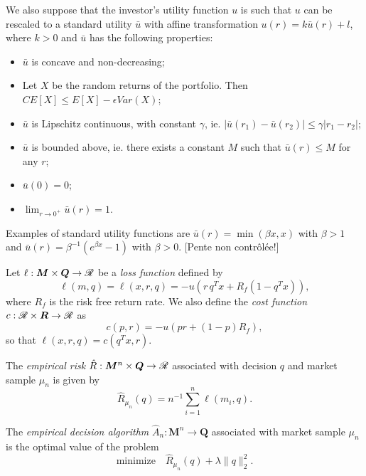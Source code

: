 \documentclass[11pt]{article}
\begin{document}
\begin{assumption}
  We also suppose that the investor's utility function $u$ is such that $u$ can be
  rescaled to a standard utility $\bar u$ with affine transformation
  $u(r) = k\bar u(r) + l$, where $k>0$ and $\bar u$ has the following properties:
  \begin{itemize}
  \item $\bar u$ is concave and non-decreasing;
  \item Let $X$ be the random returns of the portfolio. Then
    $CE[X] \leq E[X] - \epsilon Var(X)$;
  \item $\bar u$ is Lipschitz continuous, with constant $\gamma$, ie.
    $|\bar u(r_1) - \bar u(r_2)| \leq \gamma|r_1-r_2|$;
  \item $\bar u$ is bounded above, ie. there exists a constant $M$ such that $\bar
    u(r)\leq M$ for any $r$;
  \item $\bar u(0) = 0$;
  \item $\lim_{r\to 0^{+}} \bar u(r) = 1$.
  \end{itemize}
  Examples of standard utility functions are $\bar u(r) = \min(\beta x,x)$ with
  $\beta > 1$ and $\bar u(r) = \beta^{-1}(e^{\beta x}-1)$ with $\beta>0$. [Pente non
  contrôlée!]
\end{assumption}

\begin{deff}
  Let $\ell:\bm M\times \bm Q\to\mathscr{R}$ be a \textsl{loss function} defined by
  \begin{equation*}
    \ell(m,q) = \ell(x,r,q) = -u(r\,q^{T}x + R_f (1 - q^{T}x)),
  \end{equation*}
  where $R_f$ is the risk free return rate. We also define the \textsl{cost function}
  $c:\mathscr{R}\times\bm R\to\mathscr{R}$ as
  \begin{equation*}
    c(p,r) = -u(pr + (1-p)R_f),
  \end{equation*}
  so that $\ell(x,r,q) = c(q^Tx,r)$. 
\end{deff}

\begin{deff}
  The \textsl{empirical risk} $\hat R: \bm M^n\times \bm Q \to \mathscr{R}$ associated with decision
  $q$ and market sample $\mu_n$ is given by
 \begin{equation*}
   \hat R_{\mu_n}(q) = n^{-1} \sum_{i=1}^n \ell(m_i,q).
 \end{equation*}
\end{deff}

\begin{deff}
  The \textsl{empirical decision algorithm} $\hat A_n:\bm M^n \to \bm Q$ associated with
  market sample $\mu_n$ is the optimal value of the problem
  \begin{equation*}
    \text{minimize}\quad\hat R_{\mu_n}(q) + \lambda\|q\|_2^2.
  \end{equation*}
\end{deff}
\end{document}
